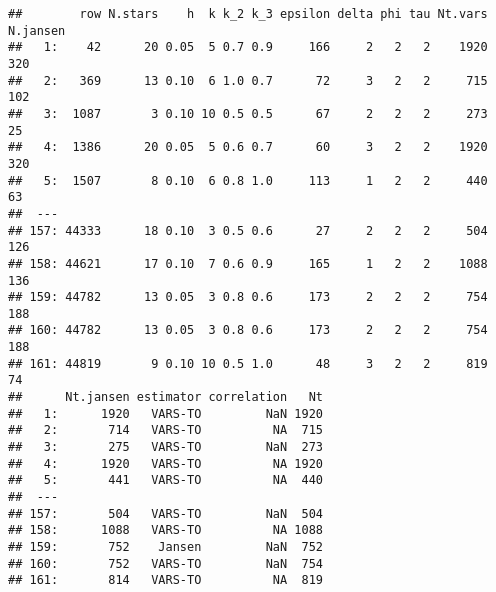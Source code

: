 \documentclass[11pt,]{article}
\newenvironment{Shaded}{\begin{snugshade}}{\end{snugshade}}
\newcommand{\CommentTok}[1]{\textcolor[rgb]{0.56,0.35,0.01}{\textit{#1}}}
\newcommand{\DataTypeTok}[1]{\textcolor[rgb]{0.13,0.29,0.53}{#1}}
\newcommand{\DecValTok}[1]{\textcolor[rgb]{0.00,0.00,0.81}{#1}}
\newcommand{\ErrorTok}[1]{\textcolor[rgb]{0.64,0.00,0.00}{\textbf{#1}}}
\newcommand{\KeywordTok}[1]{\textcolor[rgb]{0.13,0.29,0.53}{\textbf{#1}}}
\newcommand{\NormalTok}[1]{#1}
\newcommand{\OperatorTok}[1]{\textcolor[rgb]{0.81,0.36,0.00}{\textbf{#1}}}
\newcommand{\StringTok}[1]{\textcolor[rgb]{0.31,0.60,0.02}{#1}}
\begin{document}
\begin{Shaded}
\end{Shaded}

\begin{verbatim}
##        row N.stars    h  k k_2 k_3 epsilon delta phi tau Nt.vars N.jansen
##   1:    42      20 0.05  5 0.7 0.9     166     2   2   2    1920      320
##   2:   369      13 0.10  6 1.0 0.7      72     3   2   2     715      102
##   3:  1087       3 0.10 10 0.5 0.5      67     2   2   2     273       25
##   4:  1386      20 0.05  5 0.6 0.7      60     3   2   2    1920      320
##   5:  1507       8 0.10  6 0.8 1.0     113     1   2   2     440       63
##  ---                                                                     
## 157: 44333      18 0.10  3 0.5 0.6      27     2   2   2     504      126
## 158: 44621      17 0.10  7 0.6 0.9     165     1   2   2    1088      136
## 159: 44782      13 0.05  3 0.8 0.6     173     2   2   2     754      188
## 160: 44782      13 0.05  3 0.8 0.6     173     2   2   2     754      188
## 161: 44819       9 0.10 10 0.5 1.0      48     3   2   2     819       74
##      Nt.jansen estimator correlation   Nt
##   1:      1920   VARS-TO         NaN 1920
##   2:       714   VARS-TO          NA  715
##   3:       275   VARS-TO         NaN  273
##   4:      1920   VARS-TO          NA 1920
##   5:       441   VARS-TO          NA  440
##  ---                                     
## 157:       504   VARS-TO         NaN  504
## 158:      1088   VARS-TO          NA 1088
## 159:       752    Jansen         NaN  752
## 160:       752   VARS-TO         NaN  754
## 161:       814   VARS-TO          NA  819
\end{verbatim}
\end{document}
